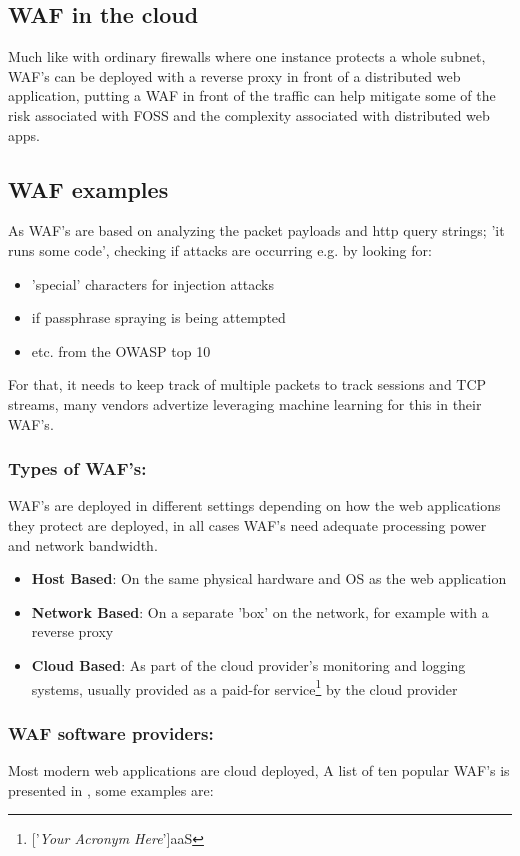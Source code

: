 \documentclass[
	letterpaper, %
	10pt, %
	unnumberedsections, %
	twoside, %
]{APAAssignment}
\begin{document}
\subsection{WAF in the cloud}
Much like with ordinary firewalls where one instance protects a whole subnet, WAF's can be deployed with a reverse proxy in front of a distributed web application, putting a WAF in front of the traffic can help mitigate some of the risk associated with FOSS and the complexity associated with distributed web apps.


\subsection{WAF examples}
As WAF's are based on analyzing the packet payloads and http query strings; 'it runs some code', checking if attacks are occurring e.g. by looking for:

\begin{itemize}
	\item 'special' characters for injection attacks
 	\item if passphrase spraying is being attempted
    \item etc. from the OWASP top 10
\end{itemize} 

For that, it needs to keep track of multiple packets to track sessions and TCP streams, many vendors advertize leveraging machine learning for this in their WAF's\cite{OpenappsecWaf}.

\subsubsection{Types of WAF's:} WAF's are deployed in different settings depending on how the web applications they protect are deployed, in all cases WAF's need adequate processing power and network bandwidth.
\begin{itemize}
	\item{\textbf{Host Based}: On the same physical hardware and OS as the web application}
	\item{\textbf{Network Based}: On a separate 'box' on the network, for example with a reverse proxy}
	\item{\textbf{Cloud Based}: As part of the cloud provider's monitoring and logging systems, usually provided as a paid-for service\footnote{['\textit{Your Acronym Here}']aaS} by the cloud provider} 
\end{itemize}


\subsubsection{WAF software providers:}
Most modern web applications are cloud deployed, A list of ten popular WAF's is presented in \cite{OpenappsecWaf}, some examples are: 
\end{document}
